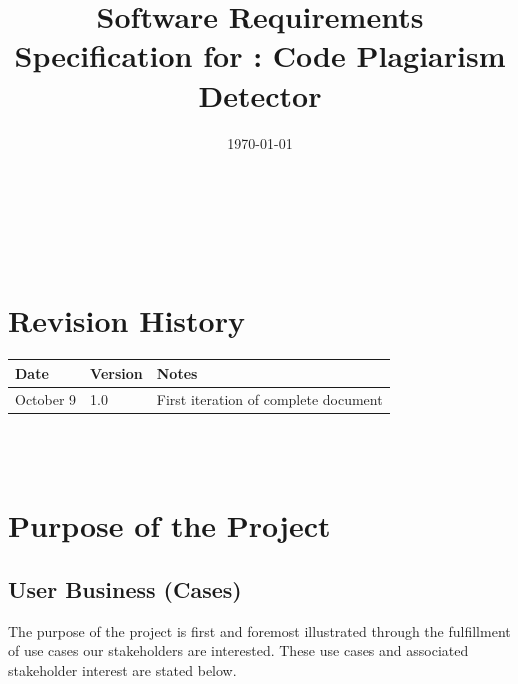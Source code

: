\documentclass[12pt]{article}
\begin{document}
\title{Software Requirements Specification for \progname: Code Plagiarism Detector} 
\author{\authname}
\date{\today}
	
\maketitle

~\newpage


\tableofcontents

~\newpage

\section*{Revision History}

\begin{tabularx}{\textwidth}{p{3cm}p{2cm}X}
\toprule {\textbf{Date}} & {\textbf{Version}} & {\textbf{Notes}}\\
\midrule
October 9 & 1.0 & First iteration of complete document\\
\bottomrule
\end{tabularx}

~\\

~\newpage
\section{Purpose of the Project}
\subsection{User Business (Cases)}

The purpose of the project is first and foremost illustrated through the 
fulfillment of use cases our stakeholders are interested. These use cases
and associated stakeholder interest are stated below.
\end{document}

